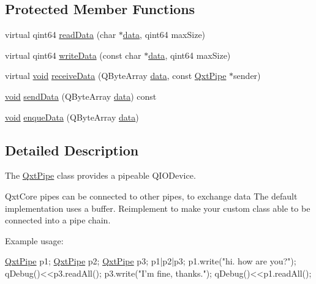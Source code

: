 \subsection*{Protected Member Functions}
\begin{DoxyCompactItemize}
\item 
virtual qint64 \hyperlink{class_qxt_pipe_a412c30a3d710e204879651a95a15b09d}{read\-Data} (char $\ast$\hyperlink{glext_8h_a8850df0785e6fbcc2351af3b686b8c7a}{data}, qint64 max\-Size)
\item 
virtual qint64 \hyperlink{class_qxt_pipe_a48b0a21c464d5d9d3cacb8b90a7cf244}{write\-Data} (const char $\ast$\hyperlink{glext_8h_a8850df0785e6fbcc2351af3b686b8c7a}{data}, qint64 max\-Size)
\item 
virtual \hyperlink{group___u_a_v_objects_plugin_ga444cf2ff3f0ecbe028adce838d373f5c}{void} \hyperlink{class_qxt_pipe_a66cbf5da29c3e305c93e7d982e03d1dc}{receive\-Data} (Q\-Byte\-Array \hyperlink{glext_8h_a8850df0785e6fbcc2351af3b686b8c7a}{data}, const \hyperlink{class_qxt_pipe}{Qxt\-Pipe} $\ast$sender)
\item 
\hyperlink{group___u_a_v_objects_plugin_ga444cf2ff3f0ecbe028adce838d373f5c}{void} \hyperlink{class_qxt_pipe_acf5e5d34b045a037820ea2afa849f42b}{send\-Data} (Q\-Byte\-Array \hyperlink{glext_8h_a8850df0785e6fbcc2351af3b686b8c7a}{data}) const 
\item 
\hyperlink{group___u_a_v_objects_plugin_ga444cf2ff3f0ecbe028adce838d373f5c}{void} \hyperlink{class_qxt_pipe_acb361157ddcd0530126ff7c4ebcec7f1}{enque\-Data} (Q\-Byte\-Array \hyperlink{glext_8h_a8850df0785e6fbcc2351af3b686b8c7a}{data})
\end{DoxyCompactItemize}


\subsection{Detailed Description}
The \hyperlink{class_qxt_pipe}{Qxt\-Pipe} class provides a pipeable Q\-I\-O\-Device. 

Qxt\-Core pipes can be connected to other pipes, to exchange data The default implementation uses a buffer. Reimplement to make your custom class able to be connected into a pipe chain.

Example usage\-: 
\begin{DoxyCode}
\hyperlink{class_qxt_pipe}{QxtPipe} p1;
\hyperlink{class_qxt_pipe}{QxtPipe} p2;
\hyperlink{class_qxt_pipe}{QxtPipe} p3;
p1|p2|p3;
p1.write(\textcolor{stringliteral}{"hi. how are you?"});
qDebug()<<p3.readAll();
p3.write(\textcolor{stringliteral}{"I'm fine, thanks."});
qDebug()<<p1.readAll();
\end{DoxyCode}


